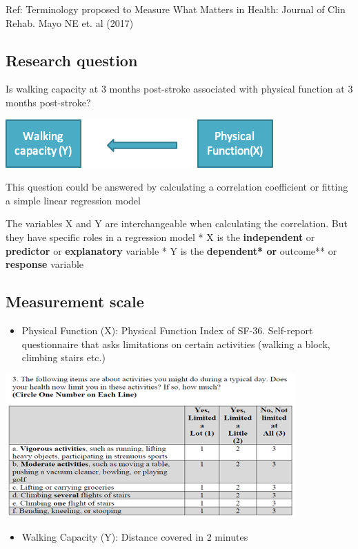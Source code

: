 \documentclass[
]{book}
\providecommand{\tightlist}{%
  \setlength{\itemsep}{0pt}\setlength{\parskip}{0pt}}
\begin{document}
Ref: Terminology proposed to Measure What Matters in Health: Journal of Clin Rehab. Mayo NE et. al (2017)

\hypertarget{research-question-1}{%
\subsection{Research question}\label{research-question-1}}

Is walking capacity at 3 months post-stroke associated with physical function at 3 months post-stroke?

\includegraphics[width=0.5\linewidth]{./12_4}

This question could be answered by calculating a correlation coefficient or fitting a simple linear regression model

The variables X and Y are interchangeable when calculating the correlation. But they have specific roles in a regression model
* X is the \textbf{independent} or \textbf{predictor} or \textbf{explanatory} variable
* Y is the \textbf{dependent* or }outcome** or \textbf{response} variable

\hypertarget{measurement-scale}{%
\subsection{Measurement scale}\label{measurement-scale}}

\begin{itemize}
\tightlist
\item
  Physical Function (X): Physical Function Index of SF-36. Self-report questionnaire that asks limitations on certain activities (walking a block, climbing stairs etc.)
\end{itemize}

\includegraphics[width=0.7\linewidth]{./12_9}

\begin{itemize}
\tightlist
\item
  Walking Capacity (Y): Distance covered in 2 minutes
\end{itemize}
\end{document}

